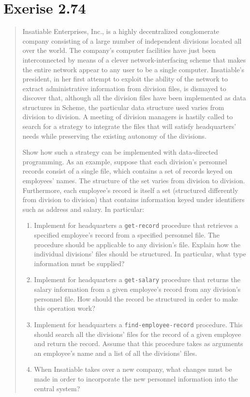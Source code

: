 \documentclass{article}
\begin{document}
\section{Exerise 2.74}
\begin{quote}
    Insatiable Enterprises, Inc., is a highly decentralized conglomerate
    company consisting of a large number of independent divisions located all
    over the world. The company’s computer facilities have just been
    interconnected by means of a clever network-interfacing scheme that makes
    the entire network appear to any user to be a single computer. Insatiable's
    president, in her first attempt to exploit the ability of the network to
    extract administrative information from division files, is dismayed to
    discover that, although all the division files have been implemented as
    data structures in Scheme, the particular data structure used varies from
    division to division. A meeting of division managers is hastily called to
    search for a strategy to integrate the files that will satisfy
    headquarters' needs while preserving the existing autonomy of the
    divisions.

    Show how such a strategy can be implemented with data-directed programming.
    As an example, suppose that each division's personnel records consist of a
    single file, which contains a set of records keyed on employees' names. The
    structure of the set varies from division to division. Furthermore, each
    employee’s record is itself a set (structured differently from division to
    division) that contains information keyed under identifiers such as address
    and salary. In particular:

    \begin{enumerate}
        \item Implement for headquarters a \texttt{get-record} procedure that
            retrieves a specified employee's record from a specified personnel
            file. The procedure should be applicable to any division's file.
            Explain how the individual divisions' files should be structured.
            In particular, what type information must be supplied?
        \item Implement for headquarters a \texttt{get-salary} procedure that
            returns the salary information from a given employee's record from
            any division's personnel file. How should the record be structured
            in order to make this operation work?
        \item Implement for headquarters a \texttt{find-employee-record}
            procedure. This should search all the divisions' files for the
            record of a given employee and return the record. Assume that this
            procedure takes as arguments an employee's name and a list of all
            the divisions' files.
        \item When Insatiable takes over a new company, what changes must be
            made in order to incorporate the new personnel information into the
            central system?
    \end{enumerate}
\end{quote}
\end{document}
